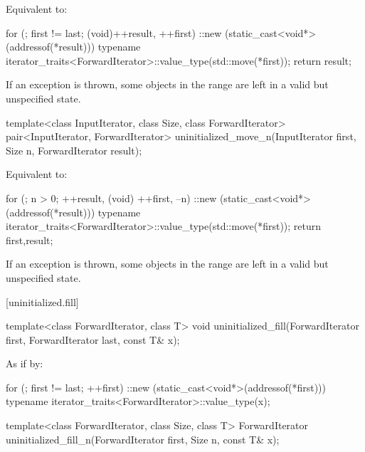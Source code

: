 \begin{itemdescr}
\pnum
\effects
Equivalent to:
\begin{codeblock}
for (; first != last; (void)++result, ++first)
  ::new (static_cast<void*>(addressof(*result)))
    typename iterator_traits<ForwardIterator>::value_type(std::move(*first));
return result;
\end{codeblock}

\pnum
\remarks
If an exception is thrown, some objects in the range 
are left in a valid but unspecified state.
\end{itemdescr}

%
\begin{itemdecl}
template<class InputIterator, class Size, class ForwardIterator>
  pair<InputIterator, ForwardIterator>
    uninitialized_move_n(InputIterator first, Size n, ForwardIterator result);
\end{itemdecl}

\begin{itemdescr}
\pnum
\effects
Equivalent to:
\begin{codeblock}
for (; n > 0; ++result, (void) ++first, --n)
  ::new (static_cast<void*>(addressof(*result)))
    typename iterator_traits<ForwardIterator>::value_type(std::move(*first));
return {first,result};
\end{codeblock}

\pnum
\remarks
If an exception is thrown, some objects in the range 
are left in a valid but unspecified state.
\end{itemdescr}

[uninitialized.fill]{}

%
\begin{itemdecl}
template<class ForwardIterator, class T>
  void uninitialized_fill(ForwardIterator first, ForwardIterator last, const T& x);
\end{itemdecl}

\begin{itemdescr}
\pnum
\effects
As if by:
\begin{codeblock}
for (; first != last; ++first)
  ::new (static_cast<void*>(addressof(*first)))
    typename iterator_traits<ForwardIterator>::value_type(x);
\end{codeblock}
\end{itemdescr}

%
\begin{itemdecl}
template<class ForwardIterator, class Size, class T>
  ForwardIterator uninitialized_fill_n(ForwardIterator first, Size n, const T& x);
\end{itemdecl}

